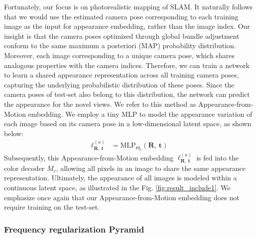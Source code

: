 Fortunately, our focus is on photorealistic mapping of SLAM. It naturally follows that we would use the estimated camera pose corresponding to each training image as the input for appearance embedding, rather than the image index. Our insight is that the camera poses optimized through global bundle adjustment conform to the same maximum a posteriori (MAP) probability distribution. Moreover, each image corresponding to a unique camera pose, which shares analogous properties with the camera indices. Therefore, we can train a network to learn a shared appearance representation across all training camera poses, capturing the underlying probabilistic distribution of these poses. Since the camera poses of test-set also belong to this distribution, the network can predict the appearance for the novel views. We refer to this method as Appearance-from-Motion embedding. We employ a tiny MLP to model the appearance variation of each image based on its camera pose in a low-dimensional latent space, as shown below:
\begin{align}
    \bm{\ell}^{(a)}_{\mathrm{\mathbf{R}},\ \mathrm{\mathbf{t}}} &= \mathrm{MLP}_{\Theta_a}(\mathrm{\mathbf{R}},\ \mathrm{\mathbf{t}})
  \label{eq:embedding}    
\end{align}
Subsequently, this Appearance-from-Motion embedding $\bm{\ell}^{(a)}_{\mathrm{\mathbf{R}},\ \mathrm{\mathbf{t}}}$ is fed into the color decoder $M_c$, allowing all pixels in an image to share the same appearance representation. Ultimately, the appearance of all images is modeled within a continuous latent space, as illustrated in the Fig. \ref{fig:result_include1}. We emphasize once again that our Appearance-from-Motion embedding does not require training on the test-set.
\subsubsection{  Frequency regularization Pyramid }

